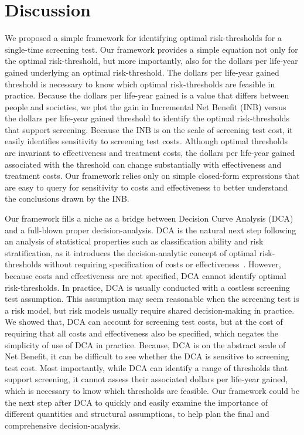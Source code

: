 \documentclass[AMA,STIX1COL]{WileyNJD-v2}
\begin{document}
\section{Discussion}
\label{Discussion}

We proposed a simple framework for identifying optimal risk-thresholds for a single-time screening test.  Our framework provides a simple equation not only for the optimal risk-threshold, but more importantly, also for the dollars per life-year gained underlying an optimal risk-threshold.  The dollars per life-year gained threshold is necessary to know which optimal risk-thresholds are feasible in practice.  Because the dollars per life-year gained is a value that differs between people and societies, we plot the gain in Incremental Net Benefit (INB) versus the dollars per life-year gained threshold to identify the optimal risk-thresholds that support screening.  Because the INB is on the scale of screening test cost, it easily identifies sensitivity to screening test costs.  Although optimal thresholds are invariant to effectiveness and treatment costs, the dollars per life-year gained associated with the threshold can change substantially with effectiveness and treatment costs.  Our framework relies only on simple closed-form expressions that are easy to query for sensitivity to costs and effectiveness to better understand the conclusions drawn by the INB.

Our framework fills a niche as a bridge between Decision Curve Analysis (DCA) and a full-blown proper decision-analysis.   DCA is the natural next step following an analysis of statistical properties such as classification ability and risk stratification, as it introduces the decision-analytic concept of optimal risk-thresholds without requiring specification of costs or effectiveness~\citep{Katki2019}.  However, because costs and effectiveness are not specified, DCA cannot identify optimal risk-thresholds.  In practice, DCA is usually conducted with a costless screening test assumption.  This assumption may seem reasonable when the screening test is a risk model, but risk models usually require shared decision-making in practice.  We showed that, DCA can account for screening test costs, but at the cost of requiring that all costs and effectiveness also be specified, which negates the simplicity of use of DCA in practice.  Because, DCA is on the abstract scale of Net Benefit, it can be difficult to see whether the DCA is sensitive to screening test cost.  Most importantly, while DCA can identify a range of thresholds that support screening, it cannot assess their associated dollars per life-year gained, which is necessary to know which thresholds are feasible.  Our framework could be the next step after DCA to quickly and easily examine the importance of different quantities and structural assumptions, to help plan the final and comprehensive decision-analysis.
\end{document}
